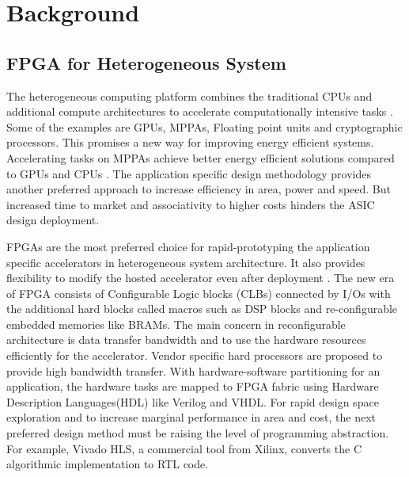 \chapter{Background}
\label{ch2_background}

\section{FPGA for Heterogeneous System}
The heterogeneous computing platform combines the traditional CPUs and additional compute architectures to accelerate computationally intensive tasks \cite{2}. Some of the examples are GPUs, MPPAs, Floating point units and cryptographic processors. This promises a new way for improving energy efficient systems. Accelerating tasks on MPPAs achieve better energy efficient solutions compared to GPUs and CPUs \cite{3}\cite{4}\cite{5}\cite{6}. The application specific design methodology provides another preferred approach to increase efficiency in area, power and speed. But increased time to market and associativity to higher costs hinders the ASIC design deployment.

FPGAs are the most preferred choice for rapid-prototyping the application specific accelerators in heterogeneous system architecture. It also provides flexibility to modify the hosted accelerator even after deployment \cite{7}\cite{8}\cite{9}. The new era of FPGA consists of Configurable Logic blocks (CLBs) connected by I/Os with the additional hard blocks called macros such as DSP blocks and re-configurable embedded memories like BRAMs. The main concern in reconfigurable architecture is data transfer bandwidth and to use the hardware resources efficiently for the accelerator. Vendor specific hard processors are proposed \cite{10} to provide high bandwidth transfer. With hardware-software partitioning for an application, the hardware tasks are mapped to FPGA fabric using Hardware Description Languages(HDL) like Verilog and VHDL. For rapid design space exploration and to increase marginal performance in area and cost, the next preferred design method must be raising the level of programming abstraction. For example, Vivado HLS, a commercial tool from Xilinx, converts the C algorithmic implementation to RTL code.  

